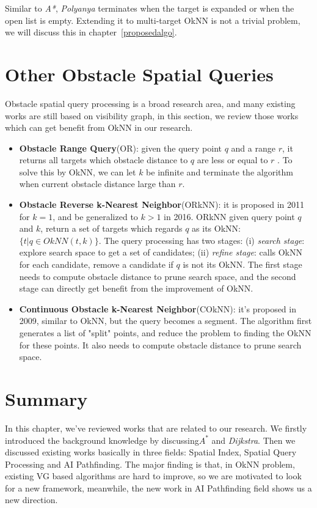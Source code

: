 Similar to \textit{A*}, \textit{Polyanya} terminates when the target is expanded or when the
open list is empty. Extending it to multi-target OkNN is not a trivial problem, we will discuss
this in chapter~\ref{proposedalgo}.

\section{Other Obstacle Spatial Queries}\label{lrquery}
Obstacle spatial query processing is a broad research area, and many existing works are still
based on visibility graph, in this section, we review those works which can get benefit from
OkNN in our research. 

\begin{itemize}

\item \textbf{Obstacle Range Query}(OR): given the query point $q$ and a range $r$,
  it returns all targets which obstacle distance to $q$ are less or equal to $r$ \cite{zhang2004spatial}. 
To solve this by OkNN, we can let $k$ be infinite and terminate the algorithm when current
obstacle distance large than $r$.

\item \textbf{Obstacle Reverse k-Nearest Neighbor}(ORkNN): it is proposed in
2011\cite{gao2011efficient} for $k=1$, and be generalized to $k>1$ in
2016\cite{gao2016reverse}. ORkNN given query point $q$ and $k$, return a set of targets which
regards $q$ as its OkNN: $\{t | q \in OkNN(t, k)\}$. The query processing has two stages:
(i) \textit{search stage}: explore search space to get a set of candidates; (ii) \textit{refine
stage}: calls OkNN for each candidate, remove a candidate if $q$ is not its OkNN.
The first stage needs to compute obstacle distance to prune search space, and the second stage 
can directly get benefit from the improvement of OkNN.

\item \textbf{Continuous Obstacle k-Nearest Neighbor}(COkNN): it's proposed in
  2009\cite{gao2009continuous}, similar to OkNN, but the query becomes a segment.
  The algorithm first generates a list of "split" points, and reduce the problem to finding the
    OkNN for these points. It also needs to compute obstacle distance to prune search space.

\end{itemize}

\section{Summary}
In this chapter, we've reviewed works that are related to our research.
We firstly introduced the background knowledge by discussing$\textit{A}^*$ and
\textit{Dijkstra}. 
Then we discussed existing works basically in three fields: Spatial Index, Spatial Query Processing and AI Pathfinding.
The major finding is that, in OkNN problem, existing VG based algorithms are hard to improve,
so we are motivated to look for a new framework, meanwhile,
the new work in AI Pathfinding field shows us a new direction.
